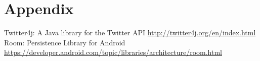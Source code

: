 \documentclass{article}
\begin{document}
\section{Appendix}










\newpage

\begin{thebibliography}{9}
  Twitter4j: A Java library for the Twitter API \url{http://twitter4j.org/en/index.html}
  Room: Persistence Library for Android \url{https://developer.android.com/topic/libraries/architecture/room.html}

\end{thebibliography}
\end{document}
